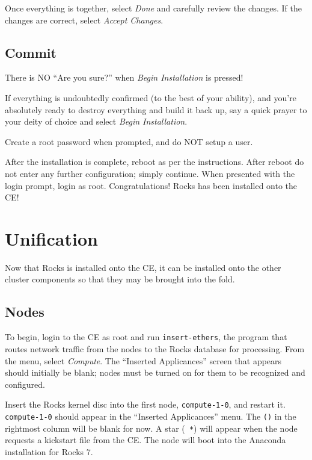 \documentclass[12pt]{article}
\begin{document}
\qq Once everything is together, select \textit{Done} and carefully review the
changes. If the changes are correct, select \textit{Accept Changes}.

\subsection{Commit}

\begin{tcolorbox}[title=WARNING, colback=white, colframe=yellow, coltitle=black]
  There is NO ``Are you sure?'' when \textit{Begin Installation} is pressed!
\end{tcolorbox}

\qq If everything is undoubtedly confirmed (to the best of your ability), and
you're absolutely ready to destroy everything and build it back up, say a quick
prayer to your deity of choice and select \textit{Begin Installation}.

\qq Create a root password when prompted, and do NOT setup a user.

\qq After the installation is complete, reboot as per the instructions. After
reboot do not enter any further configuration; simply continue. When presented
with the login prompt, login as root. Congratulations! Rocks has been installed
onto the CE!



\section{Unification}

\qq Now that Rocks is installed onto the CE, it can be installed onto the other
cluster components so that they may be brought into the fold.

\subsection{Nodes}

\qq To begin, login to the CE as root and run {\tt insert-ethers}, the program
that routes network traffic from the nodes to the Rocks database for processing.
From the menu, select \textit{Compute}. The ``Inserted Applicances'' screen that
appears should initially be blank; nodes must be turned on for them to be
recognized and configured.

\qq Insert the Rocks kernel disc into the first node, {\tt compute-1-0}, and
restart it. {\tt compute-1-0} should appear in the ``Inserted Applicances''
menu. The {\tt ()} in the rightmost column will be blank for now. A star ({\tt
  *}) will appear when the node requests a kickstart file from the
CE. The node will boot into the Anaconda installation for Rocks 7.
\end{document}
